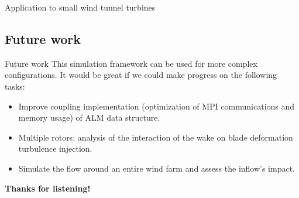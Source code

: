 \documentclass[10pt]{beamer}
\begin{document}
\begin{frame}{Application to small wind tunnel turbines}

\begin{figure}
\centering
{}
\end{figure}
\end{frame}


\subsection{Future work}

\begin{frame}{Future work}
\justifying
This simulation framework can be used for more complex configurations. It would be great if we could make progress on the following tasks:

\begin{itemize}
\justifying
\item[\large\ding{236}] Improve coupling implementation (optimization of MPI communications and memory usage) of ALM data structure.
\item[\large\ding{236}] Multiple rotors: analysis of the interaction of the wake on blade deformation turbulence injection.
\item[\large\ding{236}] Simulate the flow around an entire wind farm and assess the inflow's impact.
\end{itemize} 
\end{frame}

\begin{frame}{}
\begin{center}
\Huge\bf Thanks for listening!\\
\end{center}


\end{frame}
\end{document}
